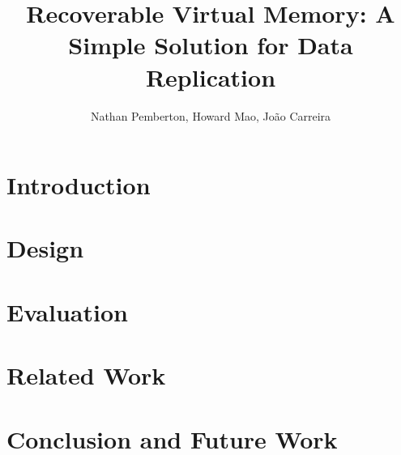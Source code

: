 \documentclass[10pt,twocolumn]{article}
\begin{document}
\title{{\bf Recoverable Virtual Memory: A Simple Solution for Data Replication}}
\author{
    Nathan Pemberton, Howard Mao, Jo\~{a}o Carreira
}
\maketitle

\begin{abstract}

\end{abstract}

\section{Introduction}

\section{Design}

\section{Evaluation}

\section{Related Work}


\section{Conclusion and Future Work}


{}

\end{document}
